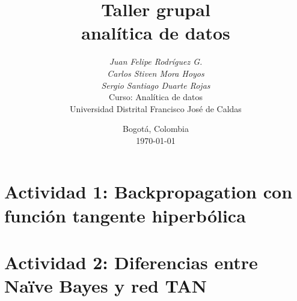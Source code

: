\documentclass[12pt,a4paper]{article}
\title{%
    \textbf{Taller grupal}\\[4pt]
    \large analítica de datos
    \vspace{2em}
}
\author{%
    \textit{Juan Felipe Rodríguez G.} \quad 20261595004 \\
    \textit{Carlos Stiven Mora Hoyos} \quad 20261595003 \\
    \vspace{3em}
    \textit{Sergio Santiago Duarte Rojas} \quad 20261595002 \\[6pt]
    \vspace{1em}
    Curso: Analítica de datos\\
    \vspace{1em}
    Universidad Distrital Francisco José de Caldas
    \vspace{1em}
}
\date{Bogotá, Colombia \\ \today}
\theoremstyle{definition}
\theoremstyle{plain}
\theoremstyle{remark}
\begin{document}
\maketitle
\thispagestyle{fancy}

\clearpage
\tableofcontents
\clearpage


\section{Actividad 1: Backpropagation con función tangente hiperbólica}


\section{Actividad 2: Diferencias entre Naïve Bayes y red TAN}

\end{document}
